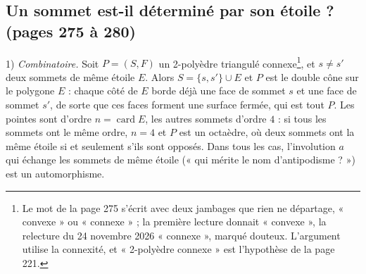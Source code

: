 \documentclass[11pt,a4paper]{article}
\begin{document}
\subsection*{Un sommet est-il déterminé par son étoile ? (pages 275 à 280)}

1) \emph{Combinatoire.} Soit $P = (S, F)$ un 2-polyèdre triangulé
connexe\footnote{Le mot de la page 275 s'écrit avec deux jambages que rien ne
départage, « convexe » ou « connexe » ; la première lecture donnait
« convexe », la relecture du 24 novembre 2026 « connexe », marqué douteux.
L'argument utilise la connexité, et « 2-polyèdre connexe » est l'hypothèse de
la page 221.}, et $s \neq s'$ deux sommets de même étoile $E$. Alors $S = \{s, s'\}
\cup E$ et $P$ est le double cône sur le polygone $E$ : chaque côté de $E$ borde
déjà une face de sommet $s$ et une face de sommet $s'$, de sorte que ces faces
forment une surface fermée, qui est tout $P$. Les pointes sont d'ordre $n =
\operatorname{card} E$, les autres sommets d'ordre $4$ : si tous les sommets ont
le même ordre, $n = 4$ et $P$ est un octaèdre, où deux sommets ont la même
étoile si et seulement s'ils sont opposés. Dans tous les cas, l'involution $a$
qui échange les sommets de même étoile (« qui mérite le nom
d'antipodisme ? ») est un automorphisme.
\end{document}
